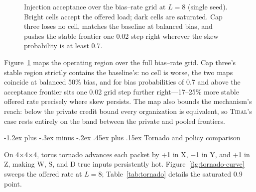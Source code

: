 \documentclass[10pt,twocolumn]{article}
\makeatletter
\newcommand{\system}{\textsc{Tidal}\xspace}
\renewcommand\subsection{\@startsection{subsection}{2}{\z@}%
  {-1.2ex plus -.3ex minus -.2ex}%
  {.45ex plus .15ex}%
  {\normalfont\normalsize\bfseries}}
\makeatother
\begin{document}
\begin{figure}[t]
\caption{Injection acceptance over the bias--rate grid at $L=8$
(single seed). Bright cells accept the offered load; dark cells are
saturated. Cap three loses no cell, matches the baseline at balanced
bias, and pushes the stable frontier one 0.02 step right wherever the
skew probability is at least 0.7.}
\label{fig:biasmap}
\end{figure}

Figure~\ref{fig:biasmap} maps the operating region over the full
bias--rate grid. Cap three's stable region strictly contains the
baseline's: no cell is worse, the two maps coincide at balanced 50\%
bias, and for bias probabilities of 0.7 and above the acceptance
frontier sits one 0.02 grid step further right---17--25\% more stable
offered rate precisely where skew persists. The map also bounds the
mechanism's reach: below the private credit bound every organization is
equivalent, so \system's case rests entirely on the band between the
private and pooled frontiers.

\subsection{Tornado and policy comparison}

On 4$\times$4$\times$4, torus tornado advances each packet by +1 in X, +1 in
Y, and +1 in Z, making W, S, and D true inputs persistently hot.
Figure~\ref{fig:tornado-curve} sweeps the offered rate at $L=8$;
Table~\ref{tab:tornado} details the saturated 0.9 point.
\end{document}
